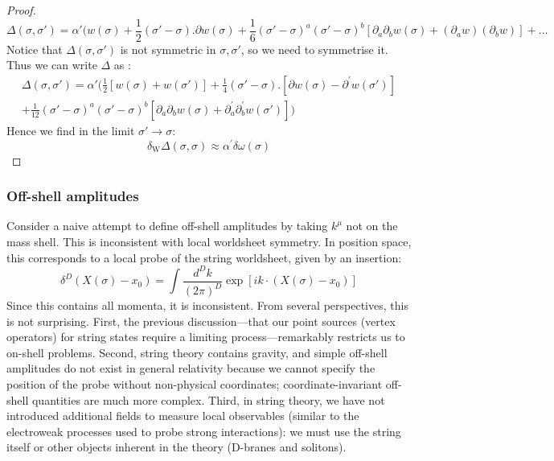 \begin{tcolorbox}[breakable]
\begin{proof}
		$$\Delta (\sigma, \sigma') =\alpha'(w(\sigma) + \frac{1}{2}(\sigma'-\sigma).\partial w(\sigma) +  \frac{1}{6}(\sigma'-\sigma)^a(\sigma'-\sigma)^b[\partial_a \partial_b w(\sigma)+(\partial_a w)(\partial_b w)]+\ldots$$
		Notice that $\Delta (\sigma, \sigma')$ is not symmetric in $\sigma, \sigma'$, so we need to symmetrise it. Thus we can write $\Delta$ as :
		\begin{multline}
			\Delta (\sigma, \sigma') =\alpha'\bigg( \frac{1}{2} [w(\sigma) + w(\sigma') ] + \frac{1}{4}(\sigma'-\sigma).[\partial w(\sigma) - \partial^{'} w(\sigma')] \\+  \frac{1}{12}(\sigma'-\sigma)^a(\sigma'-\sigma)^b[\partial_a \partial_bw(\sigma)+\partial^{'}_a \partial_b^{'}w(\sigma')]\bigg)
		\end{multline}
		Hence we find in the limit $\sigma'\to\sigma$:
		\begin{equation}
		\delta_{\mathrm{W}} \Delta(\sigma, \sigma)\approx\alpha^{\prime} \delta \omega(\sigma)
		\end{equation}
	\end{proof}
\end{tcolorbox}
\subsubsection*{\Large Off-shell amplitudes}

Consider a naive attempt to define off-shell amplitudes by taking $k^\mu$ not on the mass shell. This is inconsistent with local worldsheet symmetry. In position space, this corresponds to a local probe of the string worldsheet, given by an insertion:
\begin{equation}\label{3.6.12}
	\delta^{D}\left(X(\sigma)-x_{0}\right)=\int \frac{d^{D} k}{(2 \pi)^{D}} \exp \left[i k \cdot\left(X(\sigma)-x_{0}\right)\right]
\end{equation}
Since this contains all momenta, it is inconsistent. From several perspectives, this is not surprising. First, the previous discussion—that our point sources (vertex operators) for string states require a limiting process—remarkably restricts us to on-shell problems. Second, string theory contains gravity, and simple off-shell amplitudes do not exist in general relativity because we cannot specify the position of the probe without non-physical coordinates; coordinate-invariant off-shell quantities are much more complex. Third, in string theory, we have not introduced additional fields to measure local observables (similar to the electroweak processes used to probe strong interactions): we must use the string itself or other objects inherent in the theory (D-branes and solitons).

